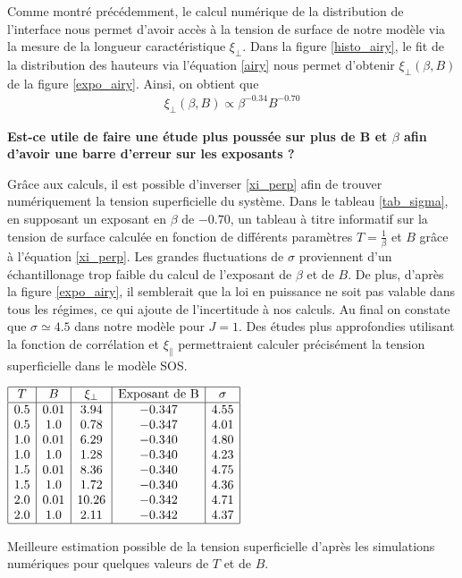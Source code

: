 Comme montré précédemment, le calcul numérique de la distribution de l'interface nous permet d'avoir accès à  la tension de surface de notre modèle via la mesure de la longueur caractéristique $\xi_\perp$. Dans la figure \ref{histo_airy}, le fit de la distribution des hauteurs via l'équation \ref{airy} nous permet d'obtenir $\xi_\perp(\beta,B)$ de la figure \ref{expo_airy}. Ainsi, on obtient que 
\begin{align}
	\xi_\perp(\beta,B) \propto \beta^{-0.34} B^{-0.70} 
\end{align}

\textbf{Est-ce utile de faire une étude plus poussée sur plus de B et $\beta$ afin d'avoir une barre d'erreur sur les exposants ?}

Grâce aux calculs, il est possible d'inverser \ref{xi_perp} afin de trouver numériquement la tension superficielle du système. Dans le tableau \ref{tab_sigma}, en supposant un exposant en $\beta$ de $-0.70$, un tableau à titre informatif sur la tension de surface calculée en fonction de différents paramètres $T = \frac{1}{\beta}$ et $B$ grâce à l'équation \ref{xi_perp}. Les grandes fluctuations de $\sigma$ proviennent d'un échantillonage trop faible du calcul de l'exposant de $\beta$ et de $B$. De plus, d'après la figure \ref{expo_airy}, il semblerait que la loi en puissance ne soit pas valable dans tous les régimes, ce qui ajoute de l'incertitude à nos calculs.
Au final on constate que $\sigma \simeq 4.5$ dans notre modèle pour $J=1$. Des études plus approfondies utilisant la fonction de corrélation et $\xi_\parallel$ permettraient calculer précisément la tension superficielle dans le modèle SOS.

\begin{table}[h]
    \centering
$\begin{array}{|c|c|c|c|c|}
\hline
    T & B & \xi_\perp & \text{Exposant de B} &  \sigma \\
\hline
0.5 & 0.01 & 3.94 & -0.347 & 4.55 \\
0.5 & 1.0 & 0.78 & -0.347 & 4.01 \\
1.0 & 0.01 & 6.29 & -0.340 & 4.80 \\
1.0 & 1.0 & 1.28 & -0.340 & 4.23 \\
1.5 & 0.01 & 8.36 & -0.340 & 4.75 \\
1.5 & 1.0 & 1.72 & -0.340 & 4.36 \\
2.0 & 0.01 & 10.26 & -0.342 & 4.71 \\
2.0 & 1.0 & 2.11 & -0.342 & 4.37 \\
\hline
\end{array}$
    \caption{Meilleure estimation possible de la tension superficielle d'après les simulations numériques pour quelques valeurs de $T$ et de $B$.  }
    \label{tab_sigma}
\end{table}

